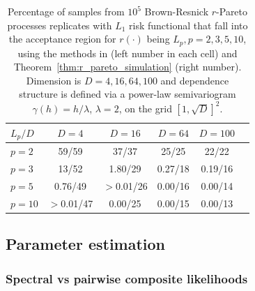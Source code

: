 \documentclass[12pt]{article}
\begin{document}

\begin{table}[ht]
    \centering
    \caption{\small Percentage of samples from $10^5$ Brown-Resnick $r$-Pareto processes replicates with $L_1$ risk functional that fall into the acceptance region for $r(\cdot)$ being $L_p,p=2,3,5,10$, using the methods in \citet{Dombry.etal:2024} (left number in each cell) and Theorem~\ref{thm:r_pareto_simulation} (right number). Dimension is $D=4,16,64,100$ and dependence structure is defined via a power-law semivariogram $\gamma(h)=h/\lambda$, $\lambda=2$, on the grid $[1,\sqrt{D}]^2$.}
    \begin{tabular}{lccccc}
    $L_p/D$ & \phantom{$>$}$D=4$ & \phantom{$>$}$D=16$ & $D=64$ & $D=100$ \\
    \hline
    $p=2$ & \phantom{$>$0.}59/59 & \phantom{$>$0.}37/37 & \phantom{0.}25/25 & \phantom{0.}22/22\\
    $p=3$ & \phantom{$>$0.}13/52 & \phantom{$>$}1.80/29 & 0.27/18 & 0.19/16\\
     $p=5$ & \phantom{$>$}0.76/49 & $>$0.01/26 & 0.00/16 & 0.00/14\\
    $p=10$ & $>$0.01/47 & \phantom{$>$}0.00/25 & 0.00/15 & 0.00/13\\
    \hline
\end{tabular}
    \label{tab:simu_exceedances_p_d}
\end{table}

\subsection{Parameter estimation}
\label{ssec:par_est}

\subsubsection{Spectral vs pairwise composite likelihoods}
\end{document}
